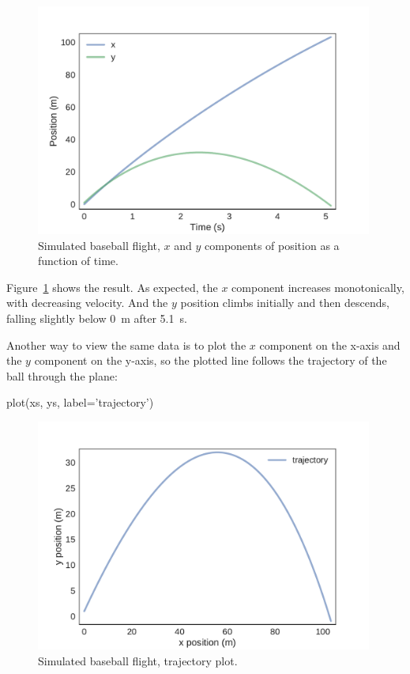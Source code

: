 \documentclass[12pt]{book}
\theoremstyle{exercise}
\begin{document}
\begin{figure}
\centerline{\includegraphics[height=3in]{figs/chap10-fig01.pdf}}
\caption{Simulated baseball flight, $x$ and $y$ components of position as a function of time.}
\label{chap10-fig01}
\end{figure}

Figure~\ref{chap10-fig01} shows the result.  As expected, the $x$ component increases monotonically, with decreasing velocity.  And the $y$ position climbs initially and then descends, falling slightly below \SI{0}{\meter} after \SI{5.1}{\second}.

Another way to view the same data is to plot the $x$ component on the x-axis and the $y$ component on the y-axis, so the plotted line follows the trajectory of the ball through the plane:

\begin{python}
plot(xs, ys, label='trajectory')
\end{python}

\begin{figure}
\centerline{\includegraphics[height=3in]{figs/chap10-fig02.pdf}}
\caption{Simulated baseball flight, trajectory plot.}
\label{chap10-fig02}
\end{figure}
\end{document}
